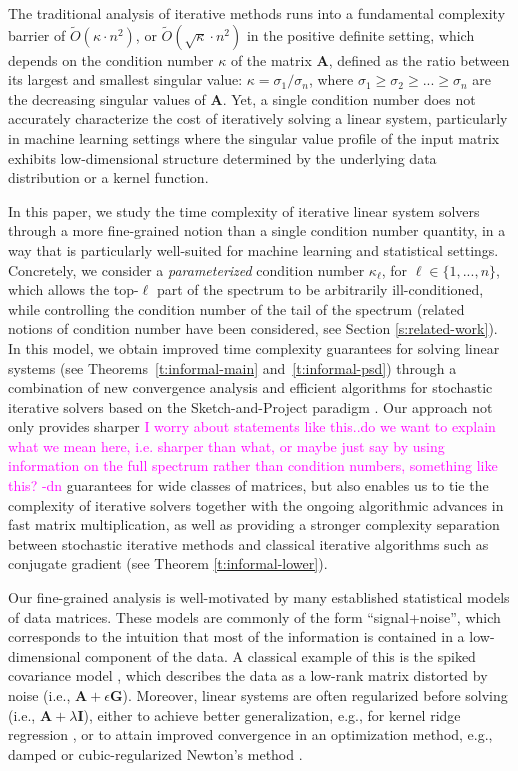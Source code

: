 \documentclass[11pt]{article}
\def\A{{\mathbf A}}
\def\G{{\mathbf G}}
\def\I{{\mathbf I}}
\newif\ifisfinal
\newcommand{\dn}[1]{\ifisfinal\else\textcolor{magenta}{#1 -dn}\fi}
\begin{document}
The traditional analysis of 
iterative methods runs into a fundamental 
complexity barrier of $\tilde O(\kappa \cdot n^2)$, or $\tilde O(\sqrt{\kappa} \cdot n^2)$ in the positive definite setting, which depends on the condition number $\kappa$ of the matrix $\A$, defined as the ratio between its largest and smallest singular value: $\kappa = \sigma_{1}/\sigma_{n}$, where $\sigma_1\geq \sigma_2\geq ...\geq \sigma_n$ are the decreasing singular values of $\A$. Yet, a single  condition number does not accurately characterize the cost of iteratively solving a linear system, particularly in machine learning settings where the singular value profile of the input matrix exhibits low-dimensional structure determined by the underlying data distribution or a kernel function.

In this paper, we study the time complexity of iterative linear system solvers through a more fine-grained notion than a single condition number quantity, in a way that is particularly well-suited for machine learning and statistical settings. Concretely, we consider a \emph{parameterized} condition number $\kappa_\ell$, for $\ell\in\{1,...,n\}$, which allows the top-$\ell$ part of the spectrum to be arbitrarily ill-conditioned, while controlling the condition number of the tail of the spectrum (related notions of condition number have been considered, see Section \ref{s:related-work}). In this model, we obtain improved time complexity guarantees for solving linear systems (see Theorems~\ref{t:informal-main} and~\ref{t:informal-psd}) through a combination of new convergence analysis and efficient algorithms for stochastic iterative solvers based on the Sketch-and-Project paradigm \cite{gower2015randomized,gower2018accelerated}.
Our approach not only provides sharper \dn{I worry about statements like this..do we want to explain what we mean here, i.e. sharper than what, or maybe just say by using information on the full spectrum rather than condition numbers, something like this?} guarantees for wide classes of matrices, but also enables us to tie the complexity of iterative solvers together with the ongoing algorithmic advances in fast matrix multiplication, as well as providing a stronger complexity separation between stochastic iterative methods and classical iterative algorithms such as conjugate gradient (see Theorem \ref{t:informal-lower}).

Our fine-grained analysis is well-motivated by many established statistical models of data matrices. These models are commonly of the form ``signal+noise'', which corresponds to the intuition that most of the information is contained in a low-dimensional component of the data. A classical example of this is the spiked covariance model \cite{johnstone2001distribution,capitaine2009largest,cai2013sparse,perry2018optimality}, which describes the data as a low-rank matrix distorted by noise (i.e., $\A+\epsilon\G$).
Moreover, linear systems are often regularized before solving (i.e., $\A+\lambda\I$), either to achieve better generalization, e.g., for kernel ridge regression \cite{alaoui2015fast}, or to attain improved convergence in an optimization method, e.g., damped or cubic-regularized Newton's method \cite{nesterov2006cubic}. 
\end{document}
